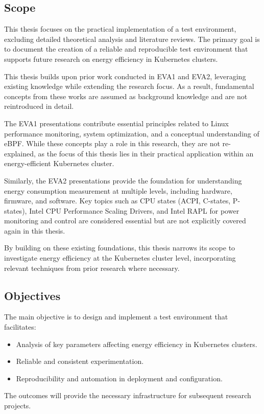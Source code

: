 \subsection{Scope}

This thesis focuses on the practical implementation of a test environment, excluding detailed theoretical analysis and literature reviews. The primary goal is to document the creation of a reliable and reproducible test environment that supports future research on energy efficiency in Kubernetes clusters.

This thesis builds upon prior work conducted in EVA1 and EVA2, leveraging existing knowledge while extending the research focus. As a result, fundamental concepts from these works are assumed as background knowledge and are not reintroduced in detail.

The EVA1 presentations contribute essential principles related to Linux performance monitoring, system optimization, and a conceptual understanding of eBPF. While these concepts play a role in this research, they are not re-explained, as the focus of this thesis lies in their practical application within an energy-efficient Kubernetes cluster.

Similarly, the EVA2 presentations provide the foundation for understanding energy consumption measurement at multiple levels, including hardware, firmware, and software. Key topics such as CPU states (ACPI, C-states, P-states), Intel CPU Performance Scaling Drivers, and Intel RAPL for power monitoring and control are considered essential but are not explicitly covered again in this thesis.

By building on these existing foundations, this thesis narrows its scope to investigate energy efficiency at the Kubernetes cluster level, incorporating relevant techniques from prior research where necessary.

\subsection{Objectives}

The main objective is to design and implement a test environment that facilitates:
\begin{itemize}
\item Analysis of key parameters affecting energy efficiency in Kubernetes clusters.
\item Reliable and consistent experimentation.
\item Reproducibility and automation in deployment and configuration.
\end{itemize}
The outcomes will provide the necessary infrastructure for subsequent research projects.

